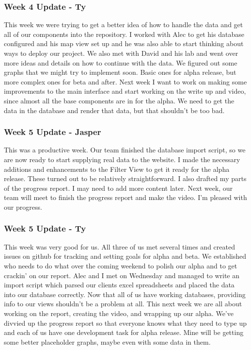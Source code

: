 \subsubsection{Week 4 Update - Ty}
This week we were trying to get a better idea of how to handle the data and get all of our components into the repository.
I worked with Alec to get his database configured and his map view set up and he was also able to start thinking about ways to deploy our project.
We also met with David and his lab and went over more ideas and details on how to continue with the data.
We figured out some graphs that we might try to implement soon.
Basic ones for alpha release, but more complex ones for beta and after.
​Next week I want to work on making some improvements to the main interface and start working on the write up and video, since almost all the base components are in for the alpha.
We need to get the data in the database and render that data, but that shouldn't be too bad.

\subsubsection{Week 5 Update - Jasper}
This was a productive week.
Our team finished the database import script, so we are now ready to start supplying real data to the website.
I made the necessary additions and enhancements to the Filter View to get it ready for the alpha release.
These turned out to be relatively straightforward.
I also drafted my parts of the progress report.
I may need to add more content later.
Next week, our team will meet to finish the progress report and make the video.​ I'm pleased with our progress.

\subsubsection{Week 5 Update - Ty}
This week was very good for us.
All three of us met several times and created issues on github for tracking and setting goals for alpha and beta.
We established who needs to do what over the coming weekend to polish our alpha and to get crackin' on our report.
Alec and I met on Wednesday and managed to write an import script which parsed our clients excel spreadsheets and placed the data into our database correctly.
Now that all of us have working databases, providing info to our views shouldn't be a problem at all.
This next week we are all about working on the report, creating the video, and wrapping up our alpha.
We've divvied up the progress report so that everyone knows what they need to type up and each of us have one development task for alpha release.
Mine will be getting some better placeholder graphs, maybe even with some data in them. ​

